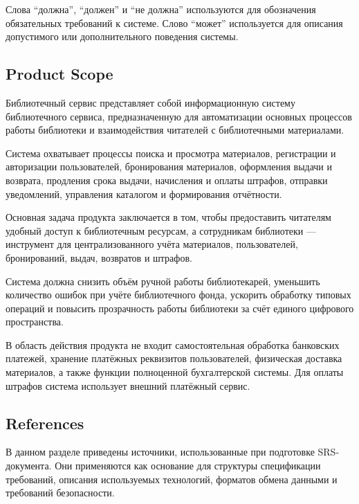 \documentclass[12pt,a4paper]{article}
\begin{document}
	Слова ``должна'', ``должен'' и ``не должна'' используются для обозначения
	обязательных требований к системе. Слово ``может'' используется для описания
	допустимого или дополнительного поведения системы.
	
	\subsection{Product Scope}
	
	Библиотечный сервис представляет собой информационную систему библиотечного сервиса,
	предназначенную для автоматизации основных процессов работы библиотеки и
	взаимодействия читателей с библиотечными материалами.
	
	Система охватывает процессы поиска и просмотра материалов, регистрации и
	авторизации пользователей, бронирования материалов, оформления выдачи и возврата,
	продления срока выдачи, начисления и оплаты штрафов, отправки уведомлений,
	управления каталогом и формирования отчётности.
	
	Основная задача продукта заключается в том, чтобы предоставить читателям удобный
	доступ к библиотечным ресурсам, а сотрудникам библиотеки — инструмент для
	централизованного учёта материалов, пользователей, бронирований, выдач,
	возвратов и штрафов.
	
	Система должна снизить объём ручной работы библиотекарей, уменьшить количество
	ошибок при учёте библиотечного фонда, ускорить обработку типовых операций и
	повысить прозрачность работы библиотеки за счёт единого цифрового пространства.
	
	В область действия продукта не входит самостоятельная обработка банковских
	платежей, хранение платёжных реквизитов пользователей, физическая доставка
	материалов, а также функции полноценной бухгалтерской системы. Для оплаты
	штрафов система использует внешний платёжный сервис.
	
	\subsection{References}
	
	В данном разделе приведены источники, использованные при подготовке SRS-документа.
	Они применяются как основание для структуры спецификации требований, описания
	используемых технологий, форматов обмена данными и требований безопасности.
	
\end{document}
